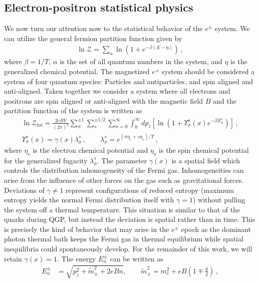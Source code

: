\documentclass[universe,article,submit,moreauthors,pdftex,a4paper]{Definitions/mdpi}
\begin{document}
\subsection{Electron-positron statistical physics}\label{sec:Partition}
\noindent We now turn our attention now to the statistical behavior of the $e^{\pm}$ system. We can utilize the general fermion partition function given by~\cite{Elze:1980er}
\begin{align}
 \label{PartFunc} \ln\mathcal{Z}=\sum_{\alpha}\ln\left(1+e^{-\beta(E-\eta)}\right)\,,
\end{align}
where $\beta=1/T$, $\alpha$ is the set of all quantum numbers in the system, and $\eta$ is the generalized chemical potential. The magnetized $e^{\pm}$ system should be considered a system of four quantum species: Particles and antiparticles, and spin aligned and anti-aligned. Taken together we consider a system where all electrons and positrons are spin aligned or anti-aligned with the magnetic field $B$ and the partition function of the system is written as
\begin{align}
 \label{PartFuncB}\ln\mathcal{Z}_{tot}=\frac{2eBV}{(2\pi)^2}\sum_{\sigma}^{\pm1}\sum_{s}^{\pm1/2}\sum_{n=0}^\infty\int^\infty_{0}dp_z\left[\ln\left(1+\Upsilon_{\sigma}^{s}(x)e^{-\beta E_{n}^{s}}\right)\right]\,,\\
 \label{Fugacity}\Upsilon_{\sigma}^{s}(x)=\gamma(x)\lambda_{\sigma}^{s}\,,\qquad\lambda_{\sigma}^{s}=e^{(\sigma\eta_{e}+s\eta_{s})/T}\,,
\end{align}
where $\eta_{e}$ is the electron chemical potential and $\eta_s$ is the spin chemical potential for the generalized fugacity $\lambda_{\sigma}^{s}$. The parameter $\gamma(x)$ is a spatial field which controls the distribution inhomogeneity of the Fermi gas. Inhomogeneities can arise from the influence of other forces on the gas such as gravitational forces. Deviations of $\gamma\neq1$ represent configurations of reduced entropy (maximum entropy yields the normal Fermi distribution itself with $\gamma=1$) without pulling the system off a thermal temperature. This situation is similar to that of the quarks during QGP, but instead the deviation is spatial rather than in time. This is precisely the kind of behavior that may arise in the $e^{\pm}$ epoch as the dominant photon thermal bath keeps the Fermi gas in thermal equilibrium while spatial inequilibria could spontaneously develop. For the remainder of this work, we will retain $\gamma(x)=1$. The energy $E_{n}^\pm$ can be written as
\begin{align}
E_{n}^\pm&=\sqrt{p^2_z+\tilde m^2_\pm+2eBn},\qquad\tilde{m}^2_\pm=m^2_e+eB\left(1\mp\frac{g}{2}\right)\,,
\end{align}
\end{document}
